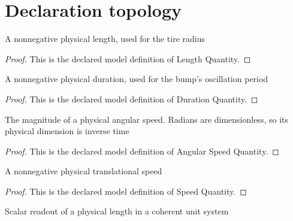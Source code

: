 \section{Declaration topology}
\begin{definition}
  \label{def:physics:phyx-mini-0225:phyxminiproblems-problemphyxmini0225-lengthquantity}
  A nonnegative physical length, used for the tire radius
\end{definition}
\begin{proof}
  This is the declared model definition of Length Quantity.
\end{proof}
\begin{definition}
  \label{def:physics:phyx-mini-0225:phyxminiproblems-problemphyxmini0225-durationquantity}
  A nonnegative physical duration, used for the bump's oscillation period
\end{definition}
\begin{proof}
  This is the declared model definition of Duration Quantity.
\end{proof}
\begin{definition}
  \label{def:physics:phyx-mini-0225:phyxminiproblems-problemphyxmini0225-angularspeedquantity}
  The magnitude of a physical angular speed. Radians are dimensionless, so its physical dimension is inverse time
\end{definition}
\begin{proof}
  This is the declared model definition of Angular Speed Quantity.
\end{proof}
\begin{definition}
  \label{def:physics:phyx-mini-0225:phyxminiproblems-problemphyxmini0225-speedquantity}
  A nonnegative physical translational speed
\end{definition}
\begin{proof}
  This is the declared model definition of Speed Quantity.
\end{proof}
\begin{definition}
  \label{def:physics:phyx-mini-0225:phyxminiproblems-problemphyxmini0225-lengthreadout}
  Scalar readout of a physical length in a coherent unit system
\end{definition}
